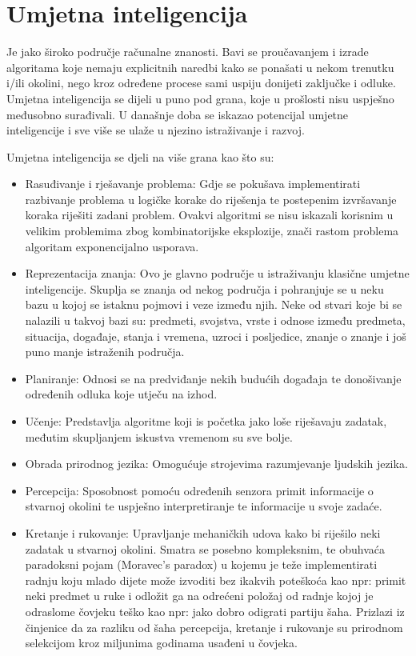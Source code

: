 \section{Umjetna inteligencija}
Je jako široko područje računalne znanosti. Bavi se proučavanjem i izrade algoritama koje nemaju explicitnih naredbi kako se ponašati u nekom trenutku i/ili okolini, nego kroz određene procese sami uspiju donijeti zaključke i odluke. Umjetna inteligencija se dijeli u puno pod grana, koje u prošlosti nisu uspješno međusobno surađivali. U današnje doba se iskazao potencijal umjetne inteligencije i sve više se ulaže u njezino istraživanje i razvoj. 

Umjetna inteligencija se djeli na više grana kao što su:
\begin{itemize}
	\item Rasuđivanje i rješavanje problema: Gdje se pokušava implementirati razbivanje problema u logičke korake do riješenja te postepenim izvršavanje koraka riješiti zadani problem. Ovakvi algoritmi se nisu iskazali korisnim u velikim problemima zbog kombinatorijske eksplozije, znači rastom problema algoritam exponencijalno usporava.
	
	\item Reprezentacija znanja: Ovo je glavno područje u istraživanju klasične umjetne inteligencije. Skuplja se znanja od nekog područja i pohranjuje se u neku bazu u kojoj se istaknu pojmovi i veze između njih. Neke od stvari koje bi se nalazili u takvoj bazi su: predmeti, svojstva, vrste i odnose između predmeta, situacija, događaje, stanja i vremena, uzroci i posljedice, znanje o znanje i još puno manje istraženih područja.
	
	\item Planiranje: Odnosi se na predviđanje nekih budućih događaja te donošivanje određenih odluka koje utječu na izhod.
	
	\item Učenje: Predstavlja algoritme koji is početka jako loše riješavaju zadatak, međutim skupljanjem iskustva vremenom su sve bolje.
	
	\item Obrada prirodnog jezika: Omogućuje strojevima razumjevanje ljudskih jezika.
	
	\item Percepcija: Sposobnost pomoću određenih senzora primit informacije o stvarnoj okolini te uspješno interpretiranje te informacije u svoje zadaće.
	
	\item Kretanje i rukovanje: Upravljanje mehaničkih udova kako bi riješilo neki zadatak u stvarnoj okolini. Smatra se posebno kompleksnim, te obuhvaća paradoksni pojam (Moravec's paradox) u kojemu je teže implementirati radnju koju mlado dijete može izvoditi bez ikakvih poteškoća kao npr: primit neki predmet u ruke i odložit ga na odrećeni položaj od radnje kojoj je odraslome čovjeku teško kao npr: jako dobro odigrati partiju šaha. Prizlazi iz činjenice da za razliku od šaha percepcija, kretanje i rukovanje su prirodnom selekcijom kroz miljunima godinama usađeni u čovjeka.
	

\end{itemize}
